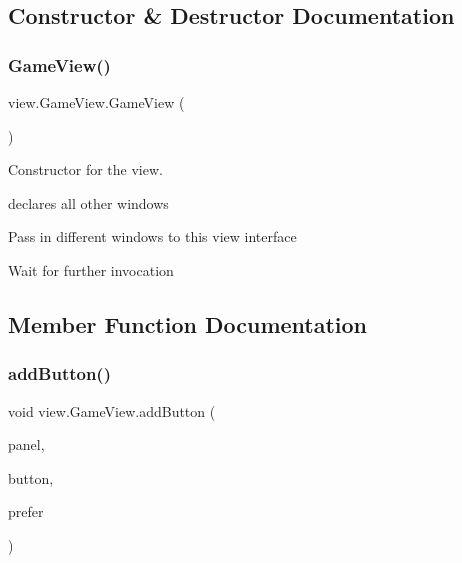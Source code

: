 \subsection{Constructor \& Destructor Documentation}
\hypertarget{classview_1_1_game_view_a2405d94a94b047f1858e0ac712983b66}{}\label{classview_1_1_game_view_a2405d94a94b047f1858e0ac712983b66} 
\subsubsection{\texorpdfstring{Game\+View()}{GameView()}}
{\footnotesize\ttfamily view.\+Game\+View.\+Game\+View (\begin{DoxyParamCaption}{ }\end{DoxyParamCaption})}



Constructor for the view. 

declares all other windows 
\begin{DoxyItemize}
\item Pass in different windows to this view interface
\item Wait for further invocation
\end{DoxyItemize}

\subsection{Member Function Documentation}
\hypertarget{classview_1_1_game_view_aebcb9f8b30adbfe48e8ef77754b74b89}{}\label{classview_1_1_game_view_aebcb9f8b30adbfe48e8ef77754b74b89} 
\subsubsection{\texorpdfstring{add\+Button()}{addButton()}}
{\footnotesize\ttfamily void view.\+Game\+View.\+add\+Button (\begin{DoxyParamCaption}\item[{J\+Panel}]{panel,  }\item[{J\+Button}]{button,  }\item[{J\+Button}]{prefer }\end{DoxyParamCaption})}

\hypertarget{classview_1_1_game_view_aba828f9bc44d416b7b7c03f71a927dbb}{}\label{classview_1_1_game_view_aba828f9bc44d416b7b7c03f71a927dbb} 
